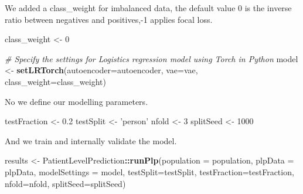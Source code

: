 \documentclass[]{article}
\newenvironment{Shaded}{\begin{snugshade}}{\end{snugshade}}
\newcommand{\KeywordTok}[1]{\textcolor[rgb]{0.13,0.29,0.53}{\textbf{#1}}}
\newcommand{\DataTypeTok}[1]{\textcolor[rgb]{0.13,0.29,0.53}{#1}}
\newcommand{\DecValTok}[1]{\textcolor[rgb]{0.00,0.00,0.81}{#1}}
\newcommand{\FloatTok}[1]{\textcolor[rgb]{0.00,0.00,0.81}{#1}}
\newcommand{\StringTok}[1]{\textcolor[rgb]{0.31,0.60,0.02}{#1}}
\newcommand{\CommentTok}[1]{\textcolor[rgb]{0.56,0.35,0.01}{\textit{#1}}}
\newcommand{\OperatorTok}[1]{\textcolor[rgb]{0.81,0.36,0.00}{\textbf{#1}}}
\newcommand{\NormalTok}[1]{#1}
\begin{document}
We added a class\_weight for imbalanced data, the default value 0 is the
inverse ratio between negatives and positives,-1 applies focal loss.

\begin{Shaded}
\begin{Highlighting}[]
\NormalTok{class_weight <-}\StringTok{ }\DecValTok{0}
\end{Highlighting}
\end{Shaded}

\begin{Shaded}
\begin{Highlighting}[]
\CommentTok{# Specify the settings for Logistics regression model using Torch in Python}
\NormalTok{model <-}\StringTok{ }\KeywordTok{setLRTorch}\NormalTok{(}\DataTypeTok{autoencoder=}\NormalTok{autoencoder, }\DataTypeTok{vae=}\NormalTok{vae,  }\DataTypeTok{class_weight=}\NormalTok{class_weight)}
\end{Highlighting}
\end{Shaded}

No we define our modelling parameters.

\begin{Shaded}
\begin{Highlighting}[]
\NormalTok{testFraction <-}\StringTok{ }\FloatTok{0.2}
\NormalTok{testSplit <-}\StringTok{ 'person'}
\NormalTok{nfold <-}\StringTok{ }\DecValTok{3}
\NormalTok{splitSeed <-}\StringTok{ }\DecValTok{1000}
\end{Highlighting}
\end{Shaded}

And we train and internally validate the model.

\begin{Shaded}
\begin{Highlighting}[]
\NormalTok{results <-}\StringTok{ }\NormalTok{PatientLevelPrediction}\OperatorTok{::}\KeywordTok{runPlp}\NormalTok{(}\DataTypeTok{population =}\NormalTok{ population, }
                                          \DataTypeTok{plpData =}\NormalTok{ plpData, }
                                          \DataTypeTok{modelSettings =}\NormalTok{ model,}
                                          \DataTypeTok{testSplit=}\NormalTok{testSplit,}
                                          \DataTypeTok{testFraction=}\NormalTok{testFraction,}
                                          \DataTypeTok{nfold=}\NormalTok{nfold, }
                                          \DataTypeTok{splitSeed=}\NormalTok{splitSeed) }
\end{Highlighting}
\end{Shaded}
\end{document}
